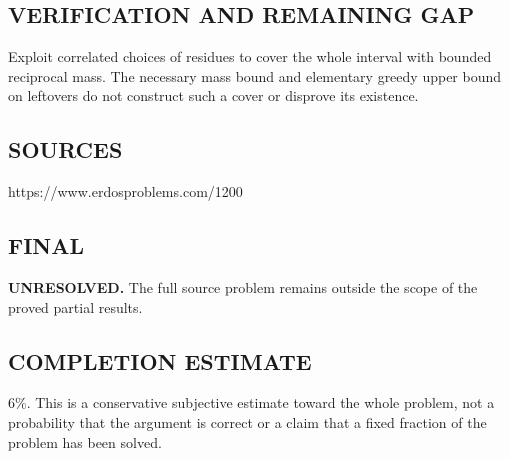 \subsection*{VERIFICATION AND REMAINING GAP}
Exploit correlated choices of residues to cover the whole interval with
bounded reciprocal mass. The necessary mass bound and elementary greedy
upper bound on leftovers do not construct such a cover or disprove its existence.

\subsection*{SOURCES}
https://www.erdosproblems.com/1200

\subsection*{FINAL}
\textbf{UNRESOLVED.} The full source problem remains outside the scope of the proved partial results.

\subsection*{COMPLETION ESTIMATE}
$6\%$. This is a conservative subjective estimate toward the whole problem, not a probability that the argument is correct or a claim that a fixed fraction of the problem has been solved.
